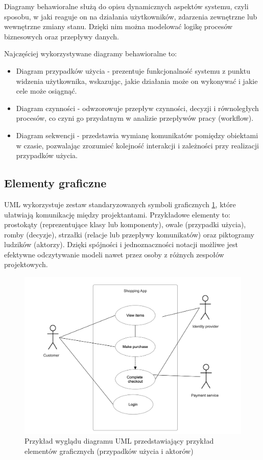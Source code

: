 \documentclass[12pt,a4paper]{article}
\begin{document}
Diagramy behawioralne służą do opisu dynamicznych aspektów systemu, czyli sposobu, w jaki reaguje on na działania użytkowników, zdarzenia zewnętrzne lub wewnętrzne zmiany stanu. Dzięki nim można modelować logikę procesów biznesowych oraz przepływy danych.

Najczęściej wykorzystywane diagramy behawioralne to:
\begin{itemize}
\item Diagram przypadków użycia - prezentuje funkcjonalność systemu z punktu widzenia użytkownika, wskazując, jakie działania może on wykonywać i jakie cele może osiągnąć.
\item Diagram czynności - odwzorowuje przepływ czynności, decyzji i równoległych procesów, co czyni go przydatnym w analizie przepływów pracy (workflow).
\item Diagram sekwencji - przedstawia wymianę komunikatów pomiędzy obiektami w czasie, pozwalając zrozumieć kolejność interakcji i zależności przy realizacji przypadków użycia.
\end{itemize}

\subsection{Elementy graficzne}

UML wykorzystuje zestaw standaryzowanych symboli graficznych \ref{fig:UML_diagram_example}, które ułatwiają komunikację między projektantami. Przykładowe elementy to: prostokąty (reprezentujące klasy lub komponenty), owale (przypadki użycia), romby (decyzje), strzałki (relacje lub przepływy komunikatów) oraz piktogramy ludzików (aktorzy).
Dzięki spójności i jednoznaczności notacji możliwe jest efektywne odczytywanie modeli nawet przez osoby z różnych zespołów projektowych.

\begin{figure}[ht]
\centering
\includegraphics[width=0.5\linewidth]{UML_diagram_example.png}
\caption{Przykład wyglądu diagramu UML przedstawiający przykład elementów graficznych (przypadków użycia i aktorów)}
\label{fig:UML_diagram_example}
\end{figure}
\end{document}
